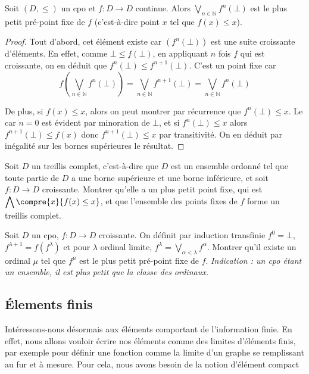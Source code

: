 \begin{prop}
    Soit $(D,\leq)$ un cpo et $f : D\to D$ continue. Alors $\displaystyle{\bigvee_{n\in\mathbb N}f^n(\bot)}$ est le plus petit pré-point fixe de $f$ (c'est-à-dire point $x$ tel que $f(x)\leq x$).
\end{prop}
\begin{proof}
    Tout d'abord, cet élément existe car $(f^n(\bot))$ est une suite croissante d'éléments. En effet, comme $\bot\leq f(\bot)$, en appliquant $n$ fois $f$ qui est croissante, on en déduit que $f^n(\bot)\leq f^{n+1}(\bot)$. C'est un point fixe car $$f\left(\bigvee_{n\in\mathbb N}f^n(\bot)\right)=\bigvee_{n\in\mathbb N} f^{n+1}(\bot)=\bigvee_{n\in\mathbb N}f^n(\bot)$$
    
    De plus, si $f(x)\leq x$, alors on peut montrer par récurrence que $f^n(\bot)\leq x$. Le car $n=0$ est évident par minoration de $\bot$, et si $f^n(\bot)\leq x$ alors $f^{n+1}(\bot)\leq f(x)$ donc $f^{n+1}(\bot)\leq x$ par transitivité. On en déduit par inégalité sur les bornes supérieures le résultat.
\end{proof}

\begin{exo}
    Soit $D$ un treillis complet, c'est-à-dire que $D$ est un ensemble ordonné tel que toute partie de $D$ a une borne supérieure et une borne inférieure, et soit $f : D \to D$ croissante. Montrer qu'elle a un plus petit point fixe, qui est $\displaystyle{\bigwedge\compre{x}{f(x)\leq x}}$, et que l'ensemble des points fixes de $f$ forme un treillis complet.
\end{exo}

\begin{exo}
    Soit $D$ un cpo, $f : D \to D$ croissante. On définit par induction transfinie $f^0=\bot$, $f^{\lambda+1}=f(f^\lambda)$ et pour $\lambda$ ordinal limite, $f^\lambda=\displaystyle{\bigvee_{\alpha< \lambda} f^\alpha}$. Montrer qu'il existe un ordinal $\mu$ tel que $f^\mu$ est le plus petit pré-point fixe de $f$. \textit{Indication : un cpo étant un ensemble, il est plus petit que la classe des ordinaux.}
\end{exo}

\subsection{\'Elements finis}

Intéressons-nous désormais aux éléments comportant de l'information finie. En effet, nous allons vouloir écrire nos éléments comme des limites d'éléments finis, par exemple pour définir une fonction comme la limite d'un graphe se remplissant au fur et à mesure. Pour cela, nous avons besoin de la notion d'élément compact

